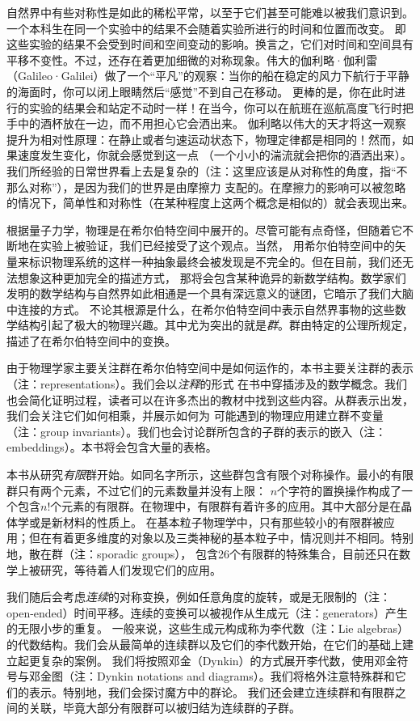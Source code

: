 \documentclass[UTF8]{book}
\begin{document}
自然界中有些对称性是如此的稀松平常，以至于它们甚至可能难以被我们意识到。一个本科生在同一个实验中的结果不会随着实验所进行的时间和位置而改变。
即这些实验的结果不会受到时间和空间变动的影响。换言之，它们对时间和空间具有平移不变性。不过，还存在着更加细微的对称现象。伟大的伽利略·伽利雷
（Galileo·Galilei）做了一个“平凡”的观察：当你的船在稳定的风力下航行于平静的海面时，你可以闭上眼睛然后“感觉”不到自己在移动。
更棒的是，你在此时进行的实验的结果会和站定不动时一样！在当今，你可以在航班在巡航高度飞行时把手中的酒杯放在一边，而不用担心它会洒出来。
伽利略以伟大的天才将这一观察提升为相对性原理：在静止或者匀速运动状态下，物理定律都是相同的！然而，如果速度发生变化，你就会感觉到这一点
（一个小小的湍流就会把你的酒洒出来）。我们所经验的日常世界看上去是复杂的（注：这里应该是从对称性的角度，指“不那么对称”），是因为我们的世界是由摩擦力
支配的。在摩擦力的影响可以被忽略的情况下，简单性和对称性（在某种程度上这两个概念是相似的）就会表现出来。

根据量子力学，物理是在希尔伯特空间中展开的。尽管可能有点奇怪，但随着它不断地在实验上被验证，我们已经接受了这个观点。当然，
用希尔伯特空间中的矢量来标识物理系统的这样一种抽象最终会被发现是不完全的。但在目前，我们还无法想象这种更加完全的描述方式，
那将会包含某种诡异的新数学结构。数学家们发明的数学结构与自然界如此相通是一个具有深远意义的谜团，它暗示了我们大脑中连接的方式。
不论其根源是什么，在希尔伯特空间中表示自然界事物的这些数学结构引起了极大的物理兴趣。其中尤为突出的就是\textit{群}。群由特定的公理所规定，
描述了在希尔伯特空间中的变换。

由于物理学家主要关注群在希尔伯特空间中是如何运作的，本书主要关注群的表示（注：representations）。我们会以\textit{注释}的形式
在书中穿插涉及的数学概念。我们也会简化证明过程，读者可以在许多杰出的教材中找到这些内容。从群表示出发，我们会关注它们如何相乘，并展示如何为
可能遇到的物理应用建立群不变量（注：group invariants）。我们也会讨论群所包含的子群的表示的嵌入（注：embeddings）。本书将会包含大量的表格。

本书从研究\textit{有限}群开始。如同名字所示，这些群包含有限个对称操作。最小的有限群只有两个元素，不过它们的元素数量并没有上限：
$n$个字符的置换操作构成了一个包含$n!$个元素的有限群。在物理中，有限群有着许多的应用。其中大部分是在晶体学或是新材料的性质上。
在基本粒子物理学中，只有那些较小的有限群被应用；但在有着更多维度的对象以及三类神秘的基本粒子中，情况则并不相同。特别地，散在群（注：sporadic groups），
包含26个有限群的特殊集合，目前还只在数学上被研究，等待着人们发现它们的应用。

我们随后会考虑\textit{连续}的对称变换，例如任意角度的旋转，或是无限制的（注：open-ended）时间平移。连续的变换可以被视作从生成元（注：generators）产生的无限小步的重复。
一般来说，这些生成元构成称为李代数（注：Lie algebras）的代数结构。我们会从最简单的连续群以及它们的李代数开始，在它们的基础上建立起更复杂的案例。
我们将按照邓金（Dynkin）的方式展开李代数，使用邓金符号与邓金图（注：Dynkin notations and diagrams）。我们将格外注意特殊群和它们的表示。特别地，我们会探讨魔方中的群论。
我们还会建立连续群和有限群之间的关联，毕竟大部分有限群可以被归结为连续群的子群。
\end{document}
